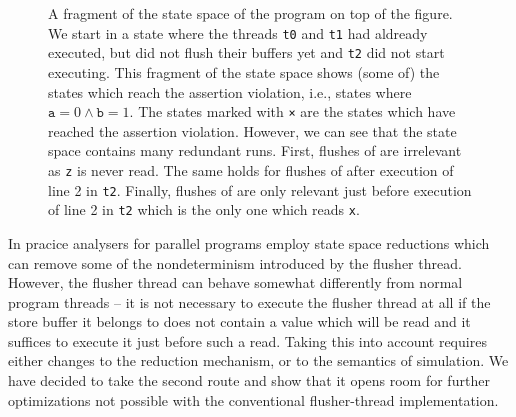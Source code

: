 \begin{figure}[p]
{}
  \caption{A fragment of the state space of the program on top of the figure.
    We start in a state where the threads \texttt{t0} and \texttt{t1} had
    aldready executed, but did not flush their buffers yet and \texttt{t2} did
    not start executing.
    This fragment of the state space shows (some of) the states which reach the
    assertion violation, i.e., states where $\texttt{a} = 0 \land \texttt{b} =
    1$.
    The states marked with \texttt{×} are the states which have reached the
    assertion violation.
    However, we can see that the state space contains many redundant runs.
    First, flushes of  are irrelevant as \texttt{z} is never read.
    The same holds for flushes of  after execution of line 2 in
    \texttt{t2}.
    Finally, flushes of  are only relevant just before execution of
    line 2 in \texttt{t2} which is the only one which reads \texttt{x}.
  }\label{fig:mm:conventional}
\end{figure}

In pracice analysers for parallel programs employ state space reductions which
can remove some of the nondeterminism introduced by the flusher thread.
However, the flusher thread can behave somewhat differently from normal program
threads -- it is not necessary to execute the flusher thread at all if the
store buffer it belongs to does not contain a value which will be read and it
suffices to execute it just before such a read.
Taking this into account requires either changes to the reduction mechanism, or
to the semantics of \xtso simulation.
We have decided to take the second route and show that it opens room for
further optimizations not possible with the conventional flusher-thread
implementation.

